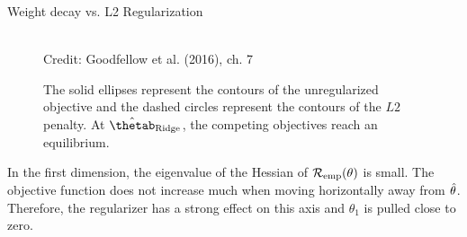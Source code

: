 \begin{vbframe}{Weight decay vs. L2 Regularization}
  \begin{figure}
    \centering
      \tiny{\\ Credit: Goodfellow et al. (2016), ch. 7}
      \caption{\footnotesize The solid ellipses represent the contours of the unregularized objective and the dashed circles represent the contours of the $L2$ penalty. At $\hat{\thetab}_{\text{Ridge}}$, the competing objectives reach an equilibrium.}
  \end{figure}
  \small
  
   In the first dimension, the eigenvalue of the Hessian of $\mathcal{R}_{\text{emp}}(\theta)$ is small. The objective function does not increase much when moving horizontally away from $\hat{\theta}$. Therefore, the regularizer has a strong effect on this axis and $\theta_1$ is pulled close to zero.
    
\framebreak
    

\end{vbframe}
